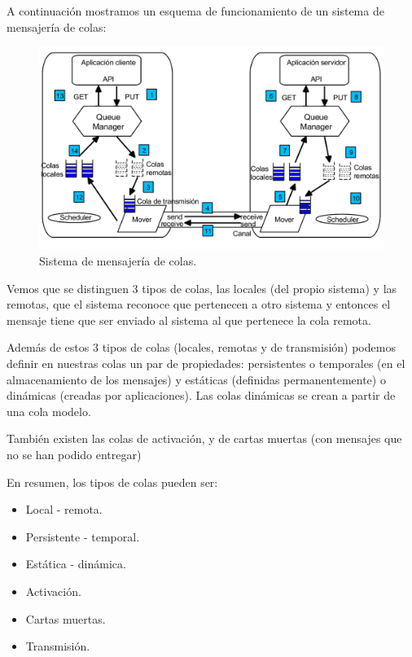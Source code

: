A continuación mostramos un esquema de funcionamiento de un sistema de mensajería de colas:


\begin{figure}[hbtp]
\centering
\includegraphics[width=1\textwidth]{img/MOMGen.png}
\caption{Sistema de mensajería de colas.}
\label{MOMGen}
\end{figure}
\newpage

Vemos que se distinguen 3 tipos de colas, las locales (del propio sistema) y las remotas, que el sistema reconoce que pertenecen a otro sistema y entonces el mensaje tiene que ser enviado al sistema al que pertenece la cola remota.

Además de estos 3 tipos de colas (locales, remotas y de transmisión) podemos definir en nuestras colas un par de propiedades: persistentes o temporales (en el almacenamiento de los mensajes) y estáticas (definidas permanentemente) o dinámicas (creadas por aplicaciones). Las colas dinámicas se crean a partir de una cola modelo.

También existen las colas de activación, y de cartas muertas (con mensajes que no se han podido entregar)


En resumen, los tipos de colas pueden ser:
\begin{itemize}
	\item Local - remota.
	\item Persistente - temporal.
	\item Estática - dinámica.
	\item Activación.
	\item Cartas muertas.
	\item Transmisión.
\end{itemize}

